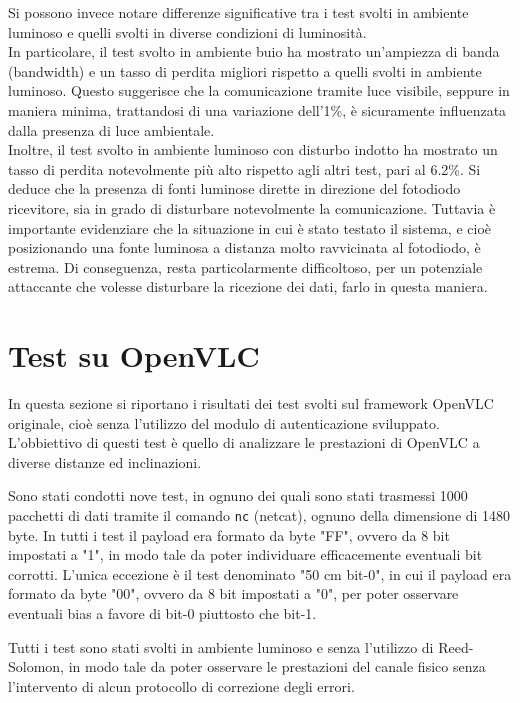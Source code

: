 Si possono invece notare differenze significative tra i test svolti in ambiente luminoso e quelli svolti in diverse condizioni di luminosità.\\
In particolare, il test svolto in ambiente buio ha mostrato un'ampiezza di banda (bandwidth) e un tasso di perdita migliori rispetto a quelli svolti in ambiente luminoso. Questo suggerisce che la comunicazione tramite luce visibile, seppure in maniera minima, trattandosi di una variazione dell'1\%, è sicuramente influenzata dalla presenza di luce ambientale.\\
Inoltre, il test svolto in ambiente luminoso con disturbo indotto ha mostrato un tasso di perdita notevolmente più alto rispetto agli altri test, pari al 6.2\%. Si deduce che la presenza di fonti luminose dirette in direzione del fotodiodo ricevitore, sia in grado di disturbare notevolmente la comunicazione. Tuttavia è importante evidenziare che la situazione in cui è stato testato il sistema, e cioè posizionando una fonte luminosa a distanza molto ravvicinata al fotodiodo, è estrema. Di conseguenza, resta particolarmente difficoltoso, per un potenziale attaccante che volesse disturbare la ricezione dei dati, farlo in questa maniera.

\section{Test su OpenVLC}
In questa sezione si riportano i risultati dei test svolti sul framework OpenVLC originale, cioè senza l'utilizzo del modulo di autenticazione sviluppato. L'obbiettivo di questi test è quello di analizzare le prestazioni di OpenVLC a diverse distanze ed inclinazioni.

Sono stati condotti nove test, in ognuno dei quali sono stati trasmessi 1000 pacchetti di dati tramite il comando \texttt{nc} (netcat), ognuno della dimensione di 1480 byte. In tutti i test il payload era formato da byte "FF", ovvero da 8 bit impostati a "1", in modo tale da poter individuare efficacemente eventuali bit corrotti. L'unica eccezione è il test denominato "50 cm bit-0", in cui il payload era formato da byte "00", ovvero da 8 bit impostati a "0", per poter osservare eventuali bias a favore di bit-0 piuttosto che bit-1.

Tutti i test sono stati svolti in ambiente luminoso e senza l'utilizzo di Reed-Solomon, in modo tale da poter osservare le prestazioni del canale fisico senza l'intervento di alcun protocollo di correzione degli errori.

